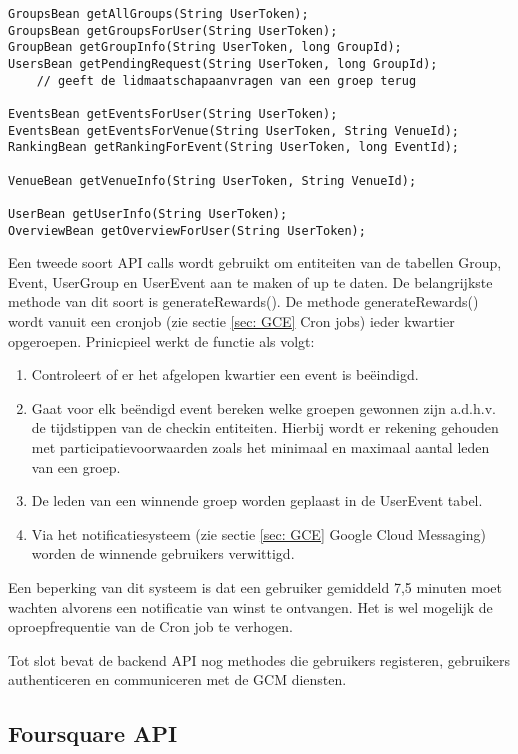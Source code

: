 \begin{lstlisting}[caption={backend API methode signaturen ter opvraging van database informatie},label=lst:backend_api]
GroupsBean getAllGroups(String UserToken);
GroupsBean getGroupsForUser(String UserToken);
GroupBean getGroupInfo(String UserToken, long GroupId);
UsersBean getPendingRequest(String UserToken, long GroupId); 
	// geeft de lidmaatschapaanvragen van een groep terug

EventsBean getEventsForUser(String UserToken);
EventsBean getEventsForVenue(String UserToken, String VenueId);
RankingBean getRankingForEvent(String UserToken, long EventId);

VenueBean getVenueInfo(String UserToken, String VenueId);

UserBean getUserInfo(String UserToken);
OverviewBean getOverviewForUser(String UserToken);
\end{lstlisting}

Een tweede soort API calls wordt gebruikt om entiteiten van de tabellen Group, Event, UserGroup en UserEvent aan te maken of up te daten. De belangrijkste methode van dit soort is generateRewards(). De methode generateRewards() wordt vanuit een cronjob (zie sectie \ref{sec: GCE} Cron jobs) ieder kwartier opgeroepen. Prinicpieel werkt de functie als volgt:
\begin{enumerate}
  \item Controleert of er het afgelopen kwartier een event is beëindigd.
  \item Gaat voor elk beëndigd event bereken welke groepen gewonnen zijn a.d.h.v. de tijdstippen van de checkin entiteiten. Hierbij wordt er rekening gehouden met participatievoorwaarden zoals het minimaal en maximaal aantal leden van een groep.
  \item De leden van een winnende groep worden geplaast in de UserEvent tabel.
  \item Via het notificatiesysteem (zie sectie \ref{sec: GCE} Google Cloud Messaging) worden de winnende gebruikers verwittigd.
\end{enumerate}
Een beperking van dit systeem is dat een gebruiker gemiddeld 7,5 minuten moet wachten alvorens een notificatie van winst te ontvangen. Het is wel mogelijk de oproepfrequentie van de Cron job te verhogen.

Tot slot bevat de backend API nog methodes die gebruikers registeren, gebruikers authenticeren en communiceren met de GCM diensten. 

\subsection{Foursquare API}
\label{Foursquare API}

